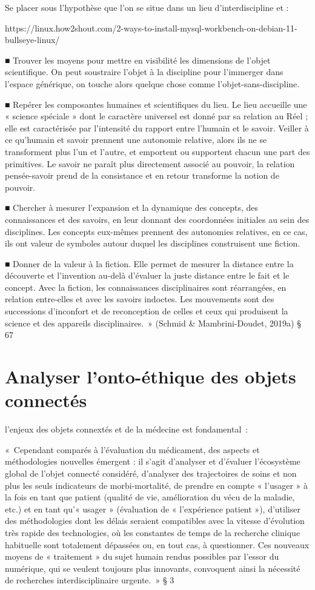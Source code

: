 \documentclass[
  a4paper,
  DIV=11,
  numbers=noendperiod]{scrreprt}
\begin{document}
Se placer sous l'hypothèse que l'on se situe dans un lieu
d'interdiscipline et :

https://linux.how2shout.com/2-ways-to-install-mysql-workbench-on-debian-11-bullseye-linux/

■ Trouver les moyens pour mettre en visibilité les dimensions de l'objet
scientifique. On peut soustraire l'objet à la discipline pour l'immerger
dans l'espace générique, on touche alors quelque chose comme
l'objet-sans-discipline.

■ Repérer les composantes humaines et scientifiques du lieu. Le lieu
accueille une « science spéciale » dont le caractère universel est donné
par sa relation au Réel ; elle est caractérisée par l'intensité du
rapport entre l'humain et le savoir. Veiller à ce qu'humain et savoir
prennent une autonomie relative, alors ils ne se transforment plus l'un
et l'autre, et emportent ou supportent chacun une part des primitives.
Le savoir ne paraît plus directement associé au pouvoir, la relation
pensée-savoir prend de la consistance et en retour transforme la notion
de pouvoir.

■ Chercher à mesurer l'expansion et la dynamique des concepts, des
connaissances et des savoirs, en leur donnant des coordonnées initiales
au sein des disciplines. Les concepts eux-mêmes prennent des autonomies
relatives, en ce cas, ils ont valeur de symboles autour duquel les
disciplines construisent une fiction.

■ Donner de la valeur à la fiction. Elle permet de mesurer la distance
entre la découverte et l'invention au-delà d'évaluer la juste distance
entre le fait et le concept. Avec la fiction, les connaissances
disciplinaires sont réarrangées, en relation entre-elles et avec les
savoirs indoctes. Les mouvements sont des successions d'inconfort et de
reconception de celles et ceux qui produisent la science et des
appareils disciplinaires.~» (Schmid \& Mambrini-Doudet, 2019a) § 67

\chapter{Analyser l'onto-éthique des objets
connectés}\label{sec-analyserOntoEthique}

l'enjeux des objets connextés et de la médecine est fondamental~:

«~Cependant comparés à l'évaluation du médicament, des aspects et
méthodologies nouvelles émergent : il s'agit d'analyser et d'évaluer
l'écosystème global de l'objet connecté considéré, d'analyser des
trajectoires de soins et non plus les seuls indicateurs de
morbi-mortalité, de prendre en compte « l'usager » à la fois en tant que
patient (qualité de vie, amélioration du vécu de la maladie, etc.) et en
tant qu'« usager » (évaluation de « l'expérience patient »), d'utiliser
des méthodologies dont les délais seraient compatibles avec la vitesse
d'évolution très rapide des technologies, où les constantes de temps de
la recherche clinique habituelle sont totalement dépassées ou, en tout
cas, à questionner. Ces nouveaux moyens de « traitement » du sujet
humain rendus possibles par l'essor du numérique, qui se veulent
toujours plus innovants, convoquent ainsi la nécessité de recherches
interdisciplinaire urgente.~» § 3
\end{document}
